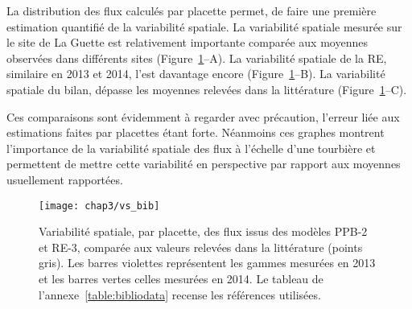 La distribution des flux calculés par placette permet, de faire une première estimation quantifié de la variabilité spatiale.
La variabilité spatiale mesurée sur le site de La Guette est relativement importante comparée aux moyennes observées dans différents sites (Figure~\ref{fig:vs_bib}--A).
La variabilité spatiale de la RE, similaire en 2013 et 2014, l'est davantage encore (Figure~\ref{fig:vs_bib}--B).
La variabilité spatiale du bilan, dépasse les moyennes relevées dans la littérature (Figure~\ref{fig:vs_bib}--C).

Ces comparaisons sont évidemment à regarder avec précaution, l'erreur liée aux estimations faites par placettes étant forte.
Néanmoins ces graphes montrent l'importance de la variabilité spatiale des flux à l'échelle d'une tourbière et permettent de mettre cette variabilité en perspective par rapport aux moyennes usuellement rapportées.


\begin{figure}[!htb]
\centering
\texttt{[image: chap3/vs\_bib]}
\caption{Variabilité spatiale, par placette, des flux issus des modèles PPB-2 et RE-3, comparée aux valeurs relevées dans la littérature (points gris). Les barres violettes représentent les gammes mesurées en 2013 et les barres vertes celles mesurées en 2014. Le tableau de l'annexe~\ref{table:bibliodata} recense les références utilisées.}
\label{fig:vs_bib}
\end{figure}
%


